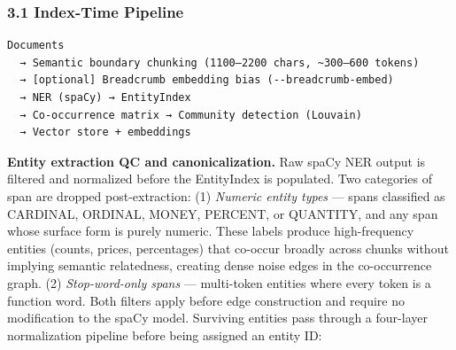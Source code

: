 \documentclass[
]{article}
\begin{document}
\subsubsection{3.1 Index-Time Pipeline}\label{index-time-pipeline}

\begin{verbatim}
Documents
  → Semantic boundary chunking (1100–2200 chars, ~300–600 tokens)
  → [optional] Breadcrumb embedding bias (--breadcrumb-embed)
  → NER (spaCy) → EntityIndex
  → Co-occurrence matrix → Community detection (Louvain)
  → Vector store + embeddings
\end{verbatim}

\textbf{Entity extraction QC and canonicalization.} Raw spaCy NER output
is filtered and normalized before the EntityIndex is populated. Two
categories of span are dropped post-extraction: (1) \emph{Numeric entity
types} --- spans classified as CARDINAL, ORDINAL, MONEY, PERCENT, or
QUANTITY, and any span whose surface form is purely numeric. These
labels produce high-frequency entities (counts, prices, percentages)
that co-occur broadly across chunks without implying semantic
relatedness, creating dense noise edges in the co-occurrence graph. (2)
\emph{Stop-word-only spans} --- multi-token entities where every token
is a function word. Both filters apply before edge construction and
require no modification to the spaCy model. Surviving entities pass
through a four-layer normalization pipeline before being assigned an
entity ID:
\end{document}
